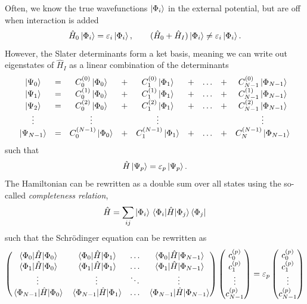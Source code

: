 Often, we know the true wavefunctions $\ket{\Phi_i}$ in the external potential, but are off when interaction is added
\begin{equation}
\hat{H}_0\ket{\Phi_i}=\varepsilon_i\ket{\Phi_i},\qquad (\hat{H}_0+\hat{H}_I)\ket{\Phi_i}\neq\varepsilon_i\ket{\Phi_i}.
\end{equation}
However, the Slater determinants form a ket basis, meaning we can write out eigenstates of $\hat{H}_I$ as a linear combination of the determinants
\begin{equation}
\mqty{
	\ket{\Psi_0}&=&C_0^{(0)}\ket{\Phi_0}&+&C_1^{(0)}\ket{\Phi_1}&+&\hdots&+&C_{N-1}^{(0)}\ket{\Phi_{N-1}}\\
	\ket{\Psi_1}&=&C_0^{(1)}\ket{\Phi_0}&+&C_1^{(1)}\ket{\Phi_1}&+&\hdots&+&C_{N-1}^{(1)}\ket{\Phi_{N-1}}\\
	\ket{\Psi_2}&=&C_0^{(2)}\ket{\Phi_0}&+&C_1^{(2)}\ket{\Phi_1}&+&\hdots&+&C_{N-1}^{(2)}\ket{\Phi_{N-1}}\\
	\vdots&&\vdots&&\vdots&&&&\vdots\\
	\ket{\Psi_{N-1}}&=&C_0^{(N-1)}\ket{\Phi_0}&+&C_1^{(N-1)}\ket{\Phi_1}&+&\hdots&+&C_N^{(N-1)}\ket{\Phi_{N-1}}
}
\end{equation}
such that 
\begin{equation}
\hat{H}\ket{\Psi_p}=\varepsilon_p\ket{\Psi_p}.
\end{equation}
The Hamiltonian can be rewritten as a double sum over all states using the so-called \textit{completeness relation}, 
\begin{equation}
\hat{H}=\sum_{ij}\ket{\Phi_i}\mel{\Phi_i}{\hat{H}}{\Phi_j}\bra{\Phi_j}
\end{equation}
such that the Schr\"odinger equation can be rewritten as
\begin{equation}
\begin{pmatrix}
\mel{\Phi_0}{\hat{H}}{\Phi_0} & \mel{\Phi_0}{\hat{H}}{\Phi_1} & \hdots & \mel{\Phi_0}{\hat{H}}{\Phi_{N-1}}\\
\mel{\Phi_1}{\hat{H}}{\Phi_0} & \mel{\Phi_1}{\hat{H}}{\Phi_1} & \hdots & \mel{\Phi_1}{\hat{H}}{\Phi_{N-1}}\\
\vdots & \vdots & \ddots & \vdots\\
\mel{\Phi_{N-1}}{\hat{H}}{\Phi_0} & \mel{\Phi_{N-1}}{\hat{H}}{\Phi_1} & \hdots & \mel{\Phi_{N-1}}{\hat{H}}{\Phi_{N-1}}\\
\end{pmatrix}
\begin{pmatrix}
c_0^{(p)}\\ c_1^{(p)} \\ \vdots\\ c_{N-1}^{(p)}
\end{pmatrix}
=\varepsilon_p
\begin{pmatrix}
c_0^{(p)}\\ c_1^{(p)} \\ \vdots\\ c_{N-1}^{(p)}
\end{pmatrix}
\label{eq:CIS_matrix}
\end{equation}

